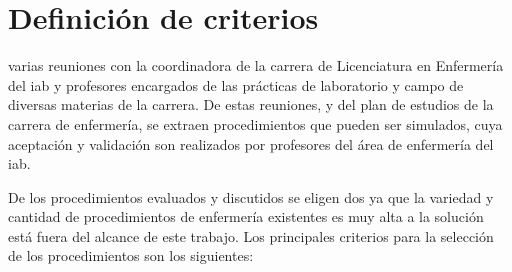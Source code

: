 \section{Definición de criterios}
\label{sec:criterios}

 varias reuniones con la coordinadora de la carrera de Licenciatura
en Enfermería del \Gls{iab} y profesores encargados de las prácticas de
laboratorio y campo de diversas materias de la carrera. De estas reuniones, y
del plan de estudios de la carrera de enfermería, se extraen procedimientos que
pueden ser simulados, cuya aceptación y validación son realizados por  
profesores del área de enfermería del \Gls{iab}.

De los procedimientos evaluados y discutidos se eligen dos ya que la variedad y
cantidad de procedimientos de enfermería existentes es muy alta  a la solución está fuera del alcance de este
trabajo. Los principales criterios para la selección de los procedimientos son
los siguientes:

